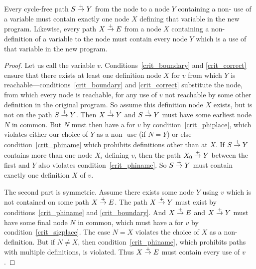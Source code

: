 \documentclass[12pt,titlepage,twoside]{article}
\begin{document}
\begin{property}\label{pty:ssi_dom}
Every cycle-free path $S \stackrel{+}{\rightarrow} Y$ from the  node to a node $Y$
containing a non-\phifunction{} use of a variable must contain exactly
one node $X$ defining that variable in the new program.  Likewise,
every path $X \stackrel{+}{\rightarrow} E$ from a node $X$ containing a
non-\sigfunction{} definition of a variable to the  node
must contain every node $Y$ which is a use of that variable in the new
program.
\end{property}
\begin{proof}
Let us call the variable $v$.  Conditions~\ref{crit_boundary} and
\ref{crit_correct} ensure that there exists at least one definition
node $X$ for $v$ from which $Y$ is
reachable---conditions~\ref{crit_boundary} and \ref{crit_correct}
substitute the  node, from which every node is reachable,
for any use of $v$ not reachable by some other definition in the
original program.  So assume this definition node $X$ exists, but is
not on the path $S\stackrel{+}{\rightarrow} Y$.  Then $X\stackrel{+}{\rightarrow} Y$ and $S\stackrel{+}{\rightarrow}
Y$ must have some earliest node $N$ in common.  But $N$ must then have
a \phifunction{} for $v$ by condition~\ref{crit_phiplace}, which
violates either our choice of $Y$ as a non-\phifunction{} use (if
$N=Y$) or else condition~\ref{crit_phiname} which prohibits
definitions other than at $X$.  If $S\stackrel{+}{\rightarrow} Y$ contains more than
one node $X_i$ defining $v$, then the path $X_0\stackrel{+}{\rightarrow} Y$ between
the first and $Y$ also violates condition~\ref{crit_phiname}.  So
$S\stackrel{+}{\rightarrow} Y$ must contain exactly one definition $X$ of $v$.

The second part is symmetric.  Assume there exists some node $Y$ using
$v$ which is not contained on some path $X \stackrel{+}{\rightarrow} E$.  The path
$X\stackrel{+}{\rightarrow} Y$ must exist by conditions~\ref{crit_phiname} and
\ref{crit_boundary}.  And $X\stackrel{+}{\rightarrow} E$ and $X\stackrel{+}{\rightarrow} Y$ must
have some final node $N$ in common, which must have a \sigfunction{}
for $v$ by condition~\ref{crit_sigplace}. The case $N=X$ violates the
choice of $X$ as a non-\sigfunction{} definition.  But if $N\not= X$,
then condition~\ref{crit_phiname}, which prohibits paths with multiple
definitions, is violated.  Thus $X\stackrel{+}{\rightarrow} E$ must contain every use
of $v$.
\end{proof}
\end{document}
